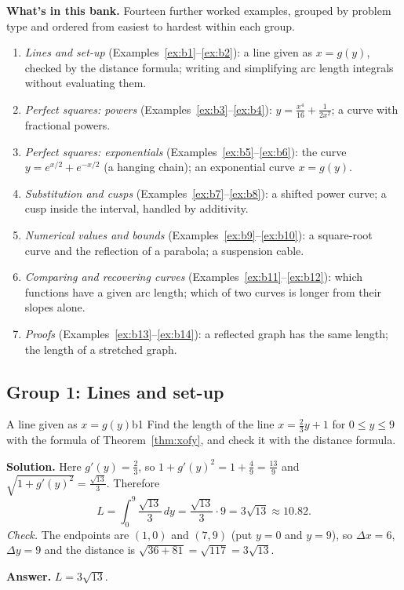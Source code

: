 \documentclass[11pt]{article}
\begin{document}
\textbf{What's in this bank.} Fourteen further worked examples, grouped by problem type and ordered from easiest to hardest within each group.
\begin{enumerate}[nosep]
  \item \emph{Lines and set-up} (Examples~\ref{ex:b1}--\ref{ex:b2}): a line given as $x=g(y)$, checked by the distance formula; writing and simplifying arc length integrals without evaluating them.
  \item \emph{Perfect squares: powers} (Examples~\ref{ex:b3}--\ref{ex:b4}): $y=\frac{x^4}{16}+\frac1{2x^2}$; a curve with fractional powers.
  \item \emph{Perfect squares: exponentials} (Examples~\ref{ex:b5}--\ref{ex:b6}): the curve $y=e^{x/2}+e^{-x/2}$ (a hanging chain); an exponential curve $x=g(y)$.
  \item \emph{Substitution and cusps} (Examples~\ref{ex:b7}--\ref{ex:b8}): a shifted power curve; a cusp inside the interval, handled by additivity.
  \item \emph{Numerical values and bounds} (Examples~\ref{ex:b9}--\ref{ex:b10}): a square-root curve and the reflection of a parabola; a suspension cable.
  \item \emph{Comparing and recovering curves} (Examples~\ref{ex:b11}--\ref{ex:b12}): which functions have a given arc length; which of two curves is longer from their slopes alone.
  \item \emph{Proofs} (Examples~\ref{ex:b13}--\ref{ex:b14}): a reflected graph has the same length; the length of a stretched graph.
\end{enumerate}

\subsection*{Group 1: Lines and set-up}

\begin{exmp}{A line given as $x=g(y)$}{b1}
Find the length of the line $x=\frac23y+1$ for $0\le y\le9$ with the formula of Theorem~\ref{thm:xofy}, and check it with the distance formula.

\textbf{Solution.} Here $g'(y)=\frac23$, so $1+g'(y)^2=1+\frac49=\frac{13}9$ and $\sqrt{1+g'(y)^2}=\frac{\sqrt{13}}3$. Therefore
\[
L=\int_0^9\frac{\sqrt{13}}3\,dy=\frac{\sqrt{13}}3\cdot9=3\sqrt{13}\approx10.82 .
\]
\emph{Check.} The endpoints are $(1,0)$ and $(7,9)$ (put $y=0$ and $y=9$), so $\Delta x=6$, $\Delta y=9$ and the distance is $\sqrt{36+81}=\sqrt{117}=3\sqrt{13}$.

\textbf{Answer.} $L=3\sqrt{13}$.
\end{exmp}
\end{document}

